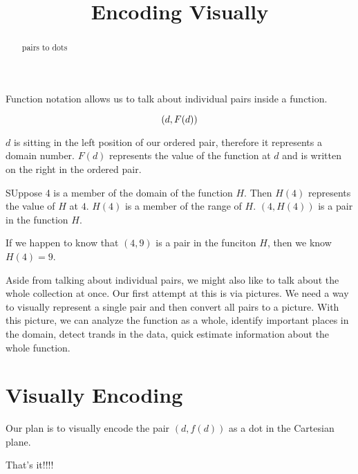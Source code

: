 \documentclass{ximera}
\title{Encoding Visually}
\begin{document}
\begin{abstract}
pairs to dots
\end{abstract}
\maketitle


Function notation allows us to talk about individual pairs inside a function.


\[
\large{ (d, F(d))}
\]

$d$ is sitting in the left position of our ordered pair, therefore it represents a domain number. $F(d)$ represents the value of the function at $d$ and is written on the right in the ordered pair.


\begin{example}
SUppose 4 is a member of the domain of the function $H$. Then $H(4)$ represents the value of $H$ at $4$. $H(4)$ is a member of the range of $H$. $(4, H(4))$ is a pair in the function $H$.

If we happen to know that $(4, 9)$ is a pair in the funciton $H$, then we know $H(4) = 9$.

\end{example}


Aside from talking about individual pairs, we might also like to talk about the whole collection at once.  Our first attempt at this is via pictures. We need a way to visually represent a single pair and then convert all pairs to a picture.  With this picture, we can analyze the function as a whole, identify important places in the domain, detect trands in the data, quick estimate information about the whole function.


\section{Visually Encoding}

Our plan is to visually encode the pair $(d,f(d))$ as a dot in the Cartesian plane.

\begin{center}
\large{That's it!!!!}
\end{center}
\end{document}
